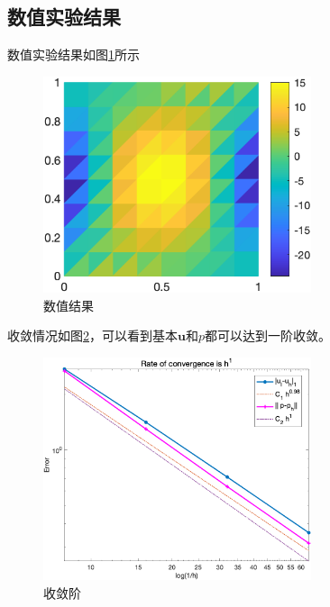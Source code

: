 \documentclass{ctexart}
\begin{document}
\subsection{数值实验结果}
数值实验结果如图\ref{Fig.numericalU}所示
\begin{figure}[H] %
    \centering %
    \includegraphics[width=0.7\textwidth]{img/numericalU.png} %
    \caption{数值结果} %
    \label{Fig.numericalU} %
\end{figure}
收敛情况如图\ref{Fig.RateOfConvergence}，可以看到基本$\mathbf{u}$和$p$都可以达到一阶收敛。
\begin{figure}[H] %
    \centering %
    \includegraphics[width=0.7\textwidth]{img/RateOfConvergence.png} %
    \caption{收敛阶} %
    \label{Fig.RateOfConvergence} %
\end{figure}
\end{document}
